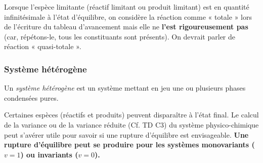 \documentclass{article}
\begin{document}
\begin{remarque}[Remarque]
    Lorsque l’espèce limitante (réactif limitant ou produit limitant) est en quantité infinitésimale à l’état d’équilibre, on considère la réaction comme « totale » lors de l’écriture du tableau d’avancement mais elle ne \textbf{l’est rigoureusement pas} (car, répétons-le,  tous les constituants sont présents). On devrait parler de réaction « quasi-totale ». 
\end{remarque}

\subsubsection{Système hétérogène}
\begin{enonce}
    Un \textit{système hétérogène} est un système mettant en jeu une ou plusieurs phases condensées pures.
\end{enonce}
Certaines espèces (réactifs et produits)  peuvent disparaître à l’état final. Le calcul de la variance ou de la variance réduite (Cf. TD C3) du système physico-chimique peut s’avérer utile pour savoir si une rupture d’équilibre est envisageable. \textbf{Une rupture d’équilibre peut se produire pour les systèmes monovariants ($v = 1$) ou invariants ($v = 0$).}\\
\end{document}
